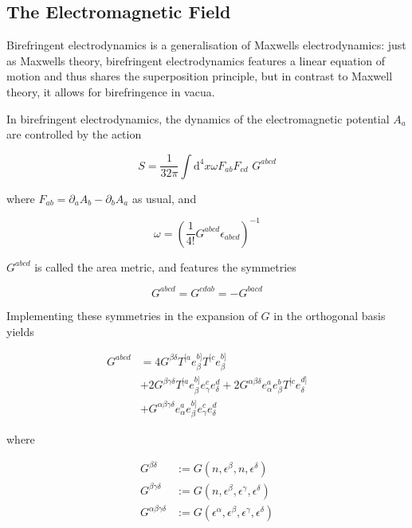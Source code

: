 \documentclass[11pt]{article}
\begin{document}
\subsection{The Electromagnetic Field}

Birefringent electrodynamics is a generalisation of Maxwells electrodynamics: just as Maxwells theory, birefringent electrodynamics features a linear equation of motion and thus shares the superposition principle, but in contrast to Maxwell theory, it allows for birefringence in vacua.

In birefringent electrodynamics, the dynamics of the electromagnetic potential $A_a$ are controlled by the action 

\begin{equation} \label{act_gled}
	S = \frac{1}{32 \pi} \int \mathrm{d}^4 x \omega F_{a b} F_{c d} \, \,
	G^{a b c d}
\end{equation}

where $F_{a b} = \partial_a A_b - \partial_b A_a $ as usual, and 

\begin{equation}
	\omega = \left( \frac{1}{4 !} G^{a b c d} \epsilon_{a b c d} \right)^{-1}
\end{equation}

 $G^{a b c d}$ is called the area metric, and features the symmetries

\begin{equation}
	G^{a b c d} = G^{c d a b} = - G^{b a c d}	
\end{equation}

Implementing these symmetries in the expansion of $G$ in the orthogonal basis yields 

\begin{equation}
	\begin{split}
		G^{a b c d} 
		&= 4 G^{\beta \delta} T^{[a} e_\beta^{b]} T^{[c} e_\beta^{b]}\\
		&+ 2 G^{\beta \gamma \delta} T^{[a} e_\beta^{b]} e_\gamma^{c} e_\delta^{d}
		+ 2 G^{\alpha \beta \delta} e_\alpha^a e_\beta^{b} T^{[c} e_\delta^{d]}\\
		&+ G^{\alpha \beta \gamma \delta} e_\alpha^a e_\beta^{b]} e_\gamma^{c} e_\delta^{d}
	\end{split}   
\end{equation}

where

\begin{align}
	G^{\beta \delta} 
	&:= G \left( n, \epsilon^\beta, n, \epsilon^\delta \right)\\
	G^{\beta \gamma \delta} 
	&:= G \left( n, \epsilon^\beta, \epsilon^\gamma, \epsilon^\delta \right)\\
	G^{\alpha \beta \gamma \delta} 
	&:= G \left( \epsilon^\alpha, \epsilon^\beta, \epsilon^\gamma, \epsilon^\delta \right)
\end{align}
\end{document}
